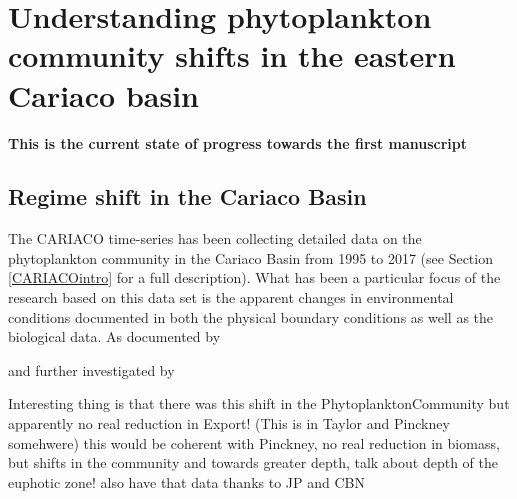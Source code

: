 \chapter{Understanding phytoplankton community shifts in the eastern Cariaco basin}

\small {\textbf{This is the current state of progress towards the first manuscript}}


\normalsize
\section{Regime shift in the Cariaco Basin}
The CARIACO time-series has been collecting detailed data on the phytoplankton community in the Cariaco Basin from 1995 to 2017 (see Section \ref{CARIACOintro} for a full description). What has been a particular focus of the research based on this data set is the apparent changes in environmental conditions documented in both the physical boundary conditions as well as the biological data. 
As documented by \citet{Taylor2012}

and further investigated by \citet{Pinckney2015}

Interesting thing is that there was this shift in the PhytoplanktonCommunity but apparently no real reduction in Export! (This is in Taylor and Pinckney somehwere)
this would be coherent with Pinckney, no real reduction in biomass, but shifts in the community and towards greater depth, talk about depth of the euphotic zone! also have that data thanks to JP and CBN

